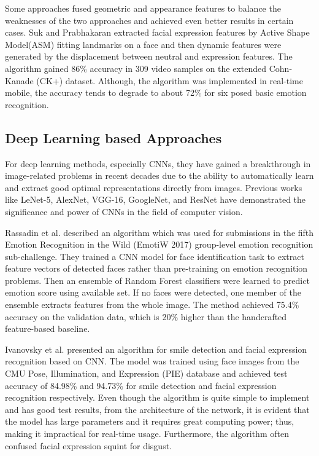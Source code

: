 \documentclass[master]{thesis-uestc}
\begin{document}
Some approaches fused geometric and appearance features to balance the weaknesses of the two approaches and achieved even better results in certain cases. Suk and Prabhakaran\cite{MSu14} extracted facial expression features by Active Shape Model(ASM) fitting landmarks on a face and then dynamic features were generated by the displacement between neutral and expression features. The algorithm gained 86\% accuracy in 309 video samples on the extended Cohn-Kanade (CK+) dataset\cite{5543262}. Although, the algorithm was implemented in real-time mobile, the accuracy tends to degrade to about 72\% for six posed basic emotion recognition.

\subsection*{Deep Learning based Approaches}
For deep learning methods, especially CNNs, they have gained a breakthrough in image-related problems in recent decades due to the ability to automatically learn and extract good optimal representations directly from images. Previous works like LeNet-5\cite{YLe98}, AlexNet\cite{Kri12}, VGG-16\cite{Kar14}, GoogleNet\cite{Chr14}, and ResNet\cite{Kai15} have demonstrated the significance and power of CNNs in the field of computer vision.

Rassadin et al.\cite{DBLP:journals/corr/abs-1709-01688} described an algorithm which was used for submissions in the fifth Emotion Recognition in the Wild (EmotiW 2017) group-level emotion recognition sub-challenge. They trained a CNN model for face identification task to extract feature vectors of detected faces rather than pre-training on emotion recognition problems. Then an ensemble of Random Forest classifiers were learned to predict emotion score using available set. If no faces were detected, one member of the ensemble extracts features from the whole image. The method achieved 75.4\% accuracy on the validation data, which is 20\% higher than the handcrafted feature-based baseline.

Ivanovsky et al.\cite{Ivanovsky-2017} presented an algorithm for smile detection and facial expression recognition based on CNN. The model was trained using face images from the CMU Pose, Illumination, and Expression (PIE) database\cite{Sim-2003-8822} and achieved test accuracy of 84.98\% and 94.73\% for smile detection and facial expression recognition respectively. Even though the algorithm is quite simple to implement and has good test results, from the architecture of the network, it is evident that the model has large parameters and it requires great computing power; thus, making it impractical for real-time usage. Furthermore, the algorithm often confused facial expression squint for disgust.
\end{document}
